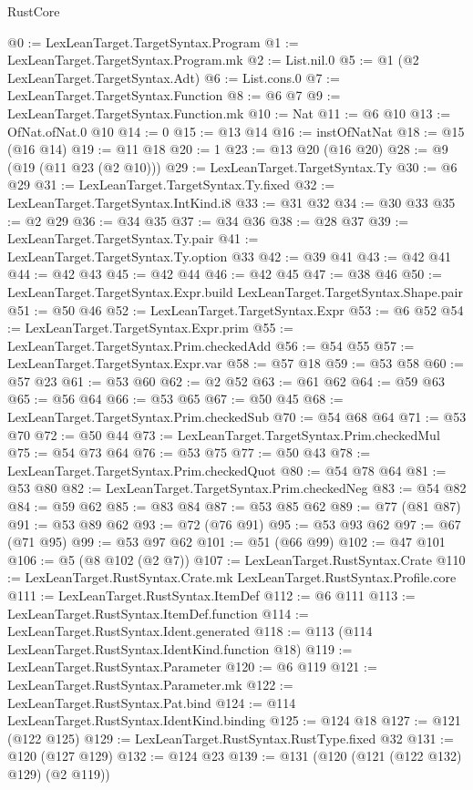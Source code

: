 \begin{lexlean}{RustCore}
\begin{coremodule}
@0 := LexLeanTarget.TargetSyntax.Program
@1 := LexLeanTarget.TargetSyntax.Program.mk
@2 := List.nil.{0}
@5 := @1 (@2 LexLeanTarget.TargetSyntax.Adt)
@6 := List.cons.{0}
@7 := LexLeanTarget.TargetSyntax.Function
@8 := @6 @7
@9 := LexLeanTarget.TargetSyntax.Function.mk
@10 := Nat
@11 := @6 @10
@13 := OfNat.ofNat.{0} @10
@14 := 0
@15 := @13 @14
@16 := instOfNatNat
@18 := @15 (@16 @14)
@19 := @11 @18
@20 := 1
@23 := @13 @20 (@16 @20)
@28 := @9 (@19 (@11 @23 (@2 @10)))
@29 := LexLeanTarget.TargetSyntax.Ty
@30 := @6 @29
@31 := LexLeanTarget.TargetSyntax.Ty.fixed
@32 := LexLeanTarget.TargetSyntax.IntKind.i8
@33 := @31 @32
@34 := @30 @33
@35 := @2 @29
@36 := @34 @35
@37 := @34 @36
@38 := @28 @37
@39 := LexLeanTarget.TargetSyntax.Ty.pair
@41 := LexLeanTarget.TargetSyntax.Ty.option @33
@42 := @39 @41
@43 := @42 @41
@44 := @42 @43
@45 := @42 @44
@46 := @42 @45
@47 := @38 @46
@50 := LexLeanTarget.TargetSyntax.Expr.build LexLeanTarget.TargetSyntax.Shape.pair
@51 := @50 @46
@52 := LexLeanTarget.TargetSyntax.Expr
@53 := @6 @52
@54 := LexLeanTarget.TargetSyntax.Expr.prim
@55 := LexLeanTarget.TargetSyntax.Prim.checkedAdd
@56 := @54 @55
@57 := LexLeanTarget.TargetSyntax.Expr.var
@58 := @57 @18
@59 := @53 @58
@60 := @57 @23
@61 := @53 @60
@62 := @2 @52
@63 := @61 @62
@64 := @59 @63
@65 := @56 @64
@66 := @53 @65
@67 := @50 @45
@68 := LexLeanTarget.TargetSyntax.Prim.checkedSub
@70 := @54 @68 @64
@71 := @53 @70
@72 := @50 @44
@73 := LexLeanTarget.TargetSyntax.Prim.checkedMul
@75 := @54 @73 @64
@76 := @53 @75
@77 := @50 @43
@78 := LexLeanTarget.TargetSyntax.Prim.checkedQuot
@80 := @54 @78 @64
@81 := @53 @80
@82 := LexLeanTarget.TargetSyntax.Prim.checkedNeg
@83 := @54 @82
@84 := @59 @62
@85 := @83 @84
@87 := @53 @85 @62
@89 := @77 (@81 @87)
@91 := @53 @89 @62
@93 := @72 (@76 @91)
@95 := @53 @93 @62
@97 := @67 (@71 @95)
@99 := @53 @97 @62
@101 := @51 (@66 @99)
@102 := @47 @101
@106 := @5 (@8 @102 (@2 @7))
@107 := LexLeanTarget.RustSyntax.Crate
@110 := LexLeanTarget.RustSyntax.Crate.mk LexLeanTarget.RustSyntax.Profile.core
@111 := LexLeanTarget.RustSyntax.ItemDef
@112 := @6 @111
@113 := LexLeanTarget.RustSyntax.ItemDef.function
@114 := LexLeanTarget.RustSyntax.Ident.generated
@118 := @113 (@114 LexLeanTarget.RustSyntax.IdentKind.function @18)
@119 := LexLeanTarget.RustSyntax.Parameter
@120 := @6 @119
@121 := LexLeanTarget.RustSyntax.Parameter.mk
@122 := LexLeanTarget.RustSyntax.Pat.bind
@124 := @114 LexLeanTarget.RustSyntax.IdentKind.binding
@125 := @124 @18
@127 := @121 (@122 @125)
@129 := LexLeanTarget.RustSyntax.RustType.fixed @32
@131 := @120 (@127 @129)
@132 := @124 @23
@139 := @131 (@120 (@121 (@122 @132) @129) (@2 @119))

\end{coremodule}
\end{lexlean}
